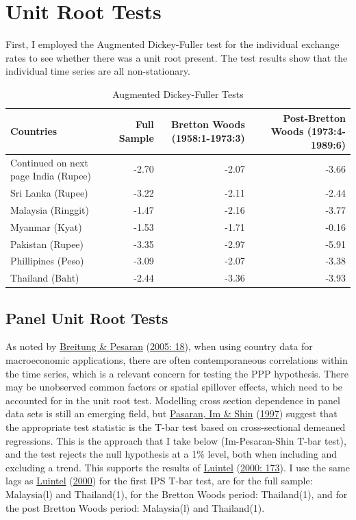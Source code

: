 \documentclass[11pt,preprint, authoryear]{elsarticle}
\numberwithin{equation}{section}
\numberwithin{figure}{section}
\numberwithin{table}{section}
\begin{document}
\hypertarget{unit-root-tests}{%
\section{\texorpdfstring{Unit Root Tests
\label{Unit}}{Unit Root Tests }}\label{unit-root-tests}}

First, I employed the Augmented Dickey-Fuller test for the individual
exchange rates to see whether there was a unit root present. The test
results show that the individual time series are all non-stationary.

\begingroup\fontsize{11pt}{12pt}\selectfont
\begin{longtable}{lrrr}
\caption{Augmented Dickey-Fuller Tests} \\ 
  \toprule
Countries & Full Sample & Bretton Woods (1958:1-1973:3) & Post-Bretton Woods (1973:4-1989:6) \\ 
  \hline 
\endhead 
\hline 
{\footnotesize Continued on next page} 
\endfoot 
\endlastfoot 
 \midrule
India (Rupee) & -2.70 & -2.07 & -3.66 \\ 
  Sri Lanka (Rupee) & -3.22 & -2.11 & -2.44 \\ 
  Malaysia (Ringgit) & -1.47 & -2.16 & -3.77 \\ 
  Myanmar (Kyat) & -1.53 & -1.71 & -0.16 \\ 
  Pakistan (Rupee) & -3.35 & -2.97 & -5.91 \\ 
  Phillipines (Peso) & -3.09 & -2.07 & -3.38 \\ 
  Thailand (Baht) & -2.44 & -3.36 & -3.93 \\ 
   \bottomrule
\end{longtable}
\endgroup

\hypertarget{panel-unit-root-tests}{%
\subsection{Panel Unit Root Tests}\label{panel-unit-root-tests}}

As noted by \protect\hyperlink{ref-pes}{Breitung \& Pesaran}
(\protect\hyperlink{ref-pes}{2005: 18}), when using country data for
macroeconomic applications, there are often contemporaneous correlations
within the time series, which is a relevant concern for testing the PPP
hypothesis. There may be unobserved common factors or spatial spillover
effects, which need to be accounted for in the unit root test. Modelling
cross section dependence in panel data sets is still an emerging field,
but \protect\hyperlink{ref-im}{Pasaran, Im \& Shin}
(\protect\hyperlink{ref-im}{1997}) suggest that the appropriate test
statistic is the T-bar test based on cross-sectional demeaned
regressions. This is the approach that I take below (Im-Pesaran-Shin
T-bar test), and the test rejects the null hypothesis at a 1\% level,
both when including and excluding a trend. This supports the results of
\protect\hyperlink{ref-Kul}{Luintel} (\protect\hyperlink{ref-Kul}{2000:
173}). I use the same lags as \protect\hyperlink{ref-Kul}{Luintel}
(\protect\hyperlink{ref-Kul}{2000}) for the first IPS T-bar test, are
for the full sample: Malaysia(l) and Thailand(1), for the Bretton Woods
period: Thailand(1), and for the post Bretton Woods period: Malaysia(l)
and Thailand(1).
\end{document}
